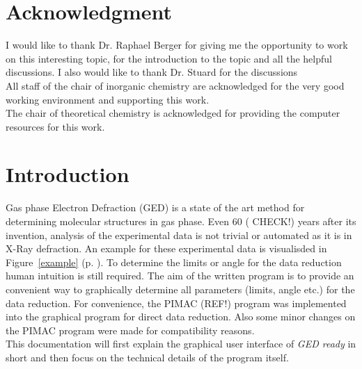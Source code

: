 \section*{Acknowledgment}
I would like to thank Dr. Raphael Berger for giving me the opportunity to work on this interesting topic, for the introduction to the topic and all the helpful discussions. I also would like to thank Dr. Stuard for the discussions \\
All staff of the chair of inorganic chemistry are acknowledged for the very good working  environment and supporting this work. \\
The chair of theoretical chemistry is acknowledged for providing the computer resources for this work. 




\section{Introduction}
Gas phase Electron Defraction  (GED) is a state of the art method for determining molecular structures in gas phase. Even 60 ( CHECK!) years after its invention, analysis of the experimental data is not trivial or automated as it is in X-Ray defraction. An example for these experimental data is visualisded in Figure~\ref{example} (p. \pageref{exaple}). To determine the limits or angle for the data reduction human intuition is still required. The aim of the written program is to provide an convenient way to graphically determine all parameters (limits, angle etc.) for the data reduction. For convenience, the PIMAC (REF!) program was implemented into the graphical program for direct data reduction. Also some minor changes on the PIMAC program were made for compatibility reasons. \\
This documentation will first explain the graphical user interface of \textit{GED ready} in short and then focus on the technical details of the program itself.  
 


 